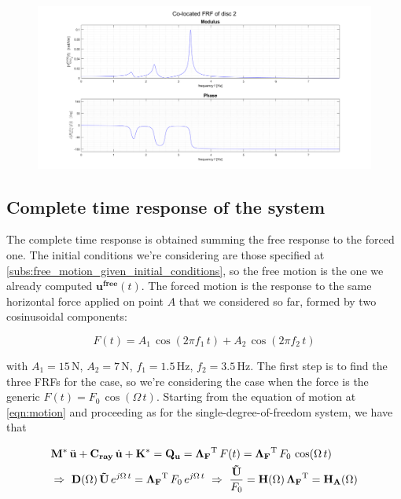 \documentclass[a4paper,12pt,oneside]{article}
\begin{document}
\begin{figure}[h]
	\hspace{-70pt}
	\includegraphics[scale=0.4]{co-located_disc2}
\end{figure}

\clearpage

\subsection{Complete time response of the system}

The complete time response is obtained summing the free response to the forced one. The initial conditions we're considering are those specified at \ref{subs:free_motion_given_initial_conditions}, so the free motion is the one we already computed $ \mathbf{u^{free}}(t) $. The forced motion is the response to the same horizontal force applied on point $ A $ that we considered so far, formed by two cosinusoidal components:

\[ F(t) = A_1 \, \cos(2 \pi f_1 \, t) + A_2 \, \cos(2 \pi f_2 \, t) \]

with $ A_1 = 15 \, \text{N} $, $ A_2 = 7 \, \text{N} $, $ f_1 = 1.5 \, \text{Hz} $, $ f_2 = 3.5 \, \text{Hz} $. The first step is to find the three FRFs for the case, so we're considering the case when the force is the generic $ F(t) = F_0 \, \cos(\Omega \, t) $. Starting from the equation of motion at \ref{eqn:motion} and proceeding as for the single-degree-of-freedom system, we have that

\[ \begin{split}
	& \mathbf{M^*} \, \ddot{\mathbf{u}} + \mathbf{C_{ray}} \, \dot{\mathbf{u}} +
		\mathbf{K^*} = \mathbf{Q_{u}} = \mathbf{\Lambda_F}^\textup{T} \, F(t) =
		\mathbf{\Lambda_F}^\textup{T} \, F_0 \, \cos(\Omega \, t) \\
	& \Rightarrow ~ \mathbf{D}(\Omega) \, \mathbf{\tilde{U}} \, e^{j \Omega \, t} =
		\mathbf{\Lambda_F}^\textup{T} \, F_0 \, e^{j \Omega \, t} ~ \Rightarrow ~
		\frac{\mathbf{\tilde{U}}}{F_0} =
		\mathbf{H}(\Omega) \, \mathbf{\Lambda_F}^\textup{T} =
		\mathbf{H_A}(\Omega)
\end{split} \]
\end{document}
